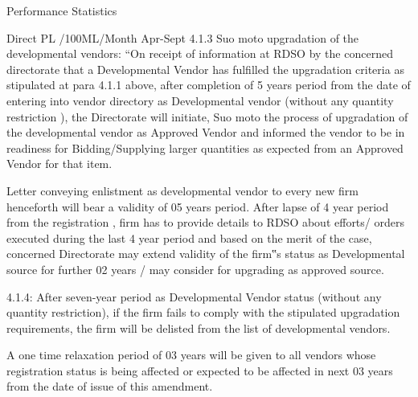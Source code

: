 \documentclass[
  ignorenonframetext,
]{beamer}
\begin{document}
\begin{frame}{Performance Statistics}
\begin{block}{Direct PL /100ML/Month Apr-Sept}
4.1.3 Suo moto upgradation of the developmental vendors: ``On receipt of
information at RDSO by the concerned directorate that a Developmental
Vendor has fulfilled the upgradation criteria as stipulated at para
4.1.1 above, after completion of 5 years period from the date of
entering into vendor directory as Developmental vendor (without any
quantity restriction ), the Directorate will initiate, Suo moto the
process of upgradation of the developmental vendor as Approved Vendor
and informed the vendor to be in readiness for Bidding/Supplying larger
quantities as expected from an Approved Vendor for that item.

Letter conveying enlistment as developmental vendor to every new firm
henceforth will bear a validity of 05 years period. After lapse of 4
year period from the registration , firm has to provide details to RDSO
about efforts/ orders executed during the last 4 year period and based
on the merit of the case, concerned Directorate may extend validity of
the firm‟s status as Developmental source for further 02 years / may
consider for upgrading as approved source.

4.1.4: After seven-year period as Developmental Vendor status (without
any quantity restriction), if the firm fails to comply with the
stipulated upgradation requirements, the firm will be delisted from the
list of developmental vendors.

A one time relaxation period of 03 years will be given to all vendors
whose registration status is being affected or expected to be affected
in next 03 years from the date of issue of this amendment.
\end{block}
\end{frame}
\end{document}
